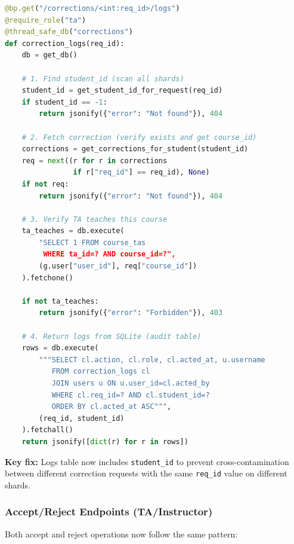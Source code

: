 \documentclass[conference]{IEEEtran}
\begin{document}
\begin{lstlisting}[language=Python]
@bp.get("/corrections/<int:req_id>/logs")
@require_role("ta")
@thread_safe_db("corrections")
def correction_logs(req_id):
    db = get_db()
    
    # 1. Find student_id (scan all shards)
    student_id = get_student_id_for_request(req_id)
    if student_id == -1:
        return jsonify({"error": "Not found"}), 404
    
    # 2. Fetch correction (verify exists and get course_id)
    corrections = get_corrections_for_student(student_id)
    req = next((r for r in corrections 
                if r["req_id"] == req_id), None)
    if not req:
        return jsonify({"error": "Not found"}), 404
    
    # 3. Verify TA teaches this course
    ta_teaches = db.execute(
        "SELECT 1 FROM course_tas 
         WHERE ta_id=? AND course_id=?",
        (g.user["user_id"], req["course_id"])
    ).fetchone()
    
    if not ta_teaches:
        return jsonify({"error": "Forbidden"}), 403
    
    # 4. Return logs from SQLite (audit table)
    rows = db.execute(
        """SELECT cl.action, cl.role, cl.acted_at, u.username
           FROM correction_logs cl
           JOIN users u ON u.user_id=cl.acted_by
           WHERE cl.req_id=? AND cl.student_id=?
           ORDER BY cl.acted_at ASC""", 
        (req_id, student_id)
    ).fetchall()
    return jsonify([dict(r) for r in rows])
\end{lstlisting}

\textbf{Key fix:} Logs table now includes \texttt{student\_id} to prevent cross-contamination between different correction requests with the same \texttt{req\_id} value on different shards.

\subsubsection{Accept/Reject Endpoints (TA/Instructor)}

Both accept and reject operations now follow the same pattern:
\end{document}
